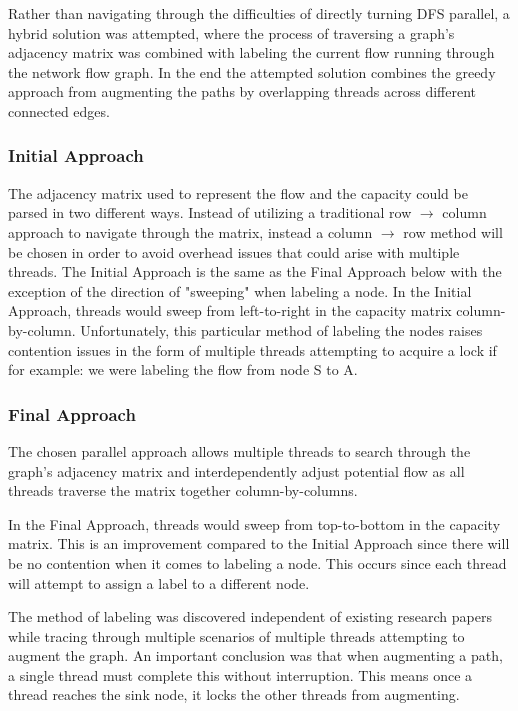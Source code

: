         Rather than navigating through the difficulties of directly turning DFS parallel, a hybrid solution was attempted, where the process of traversing a graph's adjacency matrix was combined with labeling the current flow running through the network flow graph. In the end the attempted solution combines the greedy approach from augmenting the paths by overlapping threads across different connected edges.
        
        
    \subsubsection{Initial Approach}
        The adjacency matrix used to represent the flow and the capacity could be parsed in two different ways. Instead of utilizing a traditional row $\xrightarrow{}$ column approach to navigate through the matrix, instead a column $\xrightarrow{}$ row method will be chosen in order to avoid overhead issues that could arise with multiple threads.
        The Initial Approach is the same as the Final Approach below with the exception of the direction of "sweeping" when labeling a node. In the Initial Approach, threads would sweep from left-to-right in the capacity matrix column-by-column. Unfortunately, this particular method of labeling the nodes raises contention issues in the form of multiple threads attempting to acquire a lock if for example: we were labeling the flow from node S to A.
        
        
    \subsubsection{Final Approach}
        The chosen parallel approach allows multiple threads to search through the graph's adjacency matrix and interdependently adjust potential flow as all threads traverse the matrix together column-by-columns.
        
        In the Final Approach, threads would sweep from top-to-bottom in the capacity matrix. This is an improvement compared to the Initial Approach 
        since there will be no contention when it comes to labeling a node. This occurs since each thread will attempt to assign a label to a different node.
        
        The method of labeling was discovered independent of existing research papers while tracing through multiple scenarios of multiple threads attempting to augment the graph. An important conclusion was that when augmenting a path, a single thread must complete this without interruption. This means once a thread reaches the sink node, it locks the other threads from augmenting.
    
